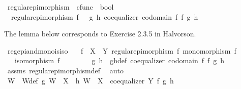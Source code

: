 \begin{isabellebody}
\isamarkupfalse%
\ regular{\isacharunderscore}{\kern0pt}epimorphism\ {\isacharcolon}{\kern0pt}{\isacharcolon}{\kern0pt}\ {\isachardoublequoteopen}cfunc\ {\isasymRightarrow}\ bool{\isachardoublequoteclose}\ \isanewline
\ \ {\isachardoublequoteopen}regular{\isacharunderscore}{\kern0pt}epimorphism\ f\ {\isacharequal}{\kern0pt}\ {\isacharparenleft}{\kern0pt}{\isasymexists}\ g\ h{\isachardot}{\kern0pt}\ coequalizer\ {\isacharparenleft}{\kern0pt}codomain\ f{\isacharparenright}{\kern0pt}\ f\ g\ h{\isacharparenright}{\kern0pt}{\isachardoublequoteclose}%
\begin{isamarkuptext}%
The lemma below corresponds to Exercise 2.3.5 in Halvorson.%
\end{isamarkuptext}\isamarkuptrue%
\isamarkupfalse%
\ reg{\isacharunderscore}{\kern0pt}epi{\isacharunderscore}{\kern0pt}and{\isacharunderscore}{\kern0pt}mono{\isacharunderscore}{\kern0pt}is{\isacharunderscore}{\kern0pt}iso{\isacharcolon}{\kern0pt}\isanewline
\ \ \ {\isachardoublequoteopen}f\ {\isacharcolon}{\kern0pt}\ X\ {\isasymrightarrow}\ Y{\isachardoublequoteclose}\ {\isachardoublequoteopen}regular{\isacharunderscore}{\kern0pt}epimorphism\ f{\isachardoublequoteclose}\ {\isachardoublequoteopen}monomorphism\ f{\isachardoublequoteclose}\isanewline
\ \ \ {\isachardoublequoteopen}isomorphism\ f{\isachardoublequoteclose}\isanewline
%
\isadelimproof
%
\endisadelimproof
%
\isatagproof
{}\isamarkupfalse%
\ {\isacharminus}{\kern0pt}\ \ \ \isanewline
\ \ \isamarkupfalse%
\ g\ h\ \ gh{\isacharunderscore}{\kern0pt}def{\isacharcolon}{\kern0pt}\ {\isachardoublequoteopen}coequalizer\ {\isacharparenleft}{\kern0pt}codomain\ f{\isacharparenright}{\kern0pt}\ f\ g\ h{\isachardoublequoteclose}\isanewline
\ \ \ \ \isamarkupfalse%
\ assms{\isacharparenleft}{\kern0pt}{}{\isacharparenright}{\kern0pt}\ regular{\isacharunderscore}{\kern0pt}epimorphism{\isacharunderscore}{\kern0pt}def\ \isamarkupfalse%
\ auto\isanewline
\ \ \isamarkupfalse%
\ W\ \ W{\isacharunderscore}{\kern0pt}def{\isacharcolon}{\kern0pt}\ {\isachardoublequoteopen}{\isacharparenleft}{\kern0pt}g{\isacharcolon}{\kern0pt}\ W\ {\isasymrightarrow}\ X{\isacharparenright}{\kern0pt}\ {\isasymand}\ {\isacharparenleft}{\kern0pt}h{\isacharcolon}{\kern0pt}\ W\ {\isasymrightarrow}\ X{\isacharparenright}{\kern0pt}\ {\isasymand}\ {\isacharparenleft}{\kern0pt}coequalizer\ Y\ f\ g\ h{\isacharparenright}{\kern0pt}{\isachardoublequoteclose}\isanewline

\end{isabellebody}

